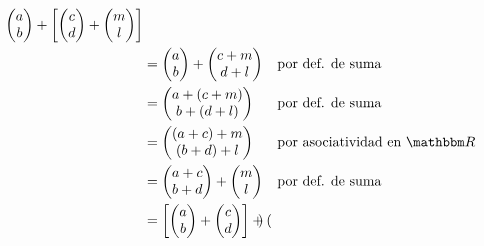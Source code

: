 \begin{examplebox}{}{}
\begin{enumerate}[label=\roman*), topsep=6pt, itemsep=0pt]
\begin{align*}
\begin{pmatrix}
                a \\
                b
            \end{pmatrix} + \left[ \begin{pmatrix}
                c \\
                d
            \end{pmatrix} + \begin{pmatrix}
                m \\
                l
            \end{pmatrix} \right] \\
            & = \begin{pmatrix}
                a \\
                b
            \end{pmatrix} + \begin{pmatrix}
                c + m \\
                d + l
            \end{pmatrix} && \text{por def. de suma} \\
            & = \begin{pmatrix}
                a + (c + m) \\
                b + (d + l)
            \end{pmatrix} && \text{por def. de suma} \\
            & = \begin{pmatrix}
                (a + c) + m \\
                (b + d) + l
            \end{pmatrix} && \text{por asociatividad en $\RR$} \\
            & = \begin{pmatrix}
                a + c \\
                b + d
            \end{pmatrix} + \begin{pmatrix}
                m \\
                l
            \end{pmatrix} && \text{por def. de suma} \\
            & = \left[ \begin{pmatrix}
                a \\
                b
            \end{pmatrix} + \begin{pmatrix}
                c \\
                d
            \end{pmatrix} \right] + \begin{pmatrix}

\end{pmatrix}
\end{align*}
\end{enumerate}
\end{examplebox}
